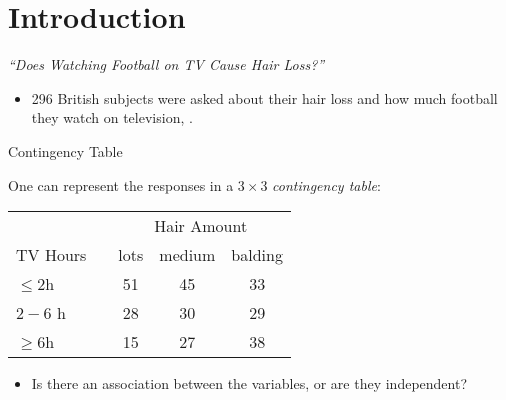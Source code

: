 \section{Introduction}

\begin{frame}{\emph{``Does Watching Football on TV Cause Hair Loss?''}}
    
    \begin{itemize}
        \item 296 British subjects were asked about their hair loss and how much football they watch on television, \cite{DMJSDS2003}.
    \end{itemize}

    \begin{block}{Contingency Table}

    One can represent the responses in a $3\times 3$ \emph{contingency table}:

    \begin{table}[h]
    \vspace{12pt}
        \begin{tabular}{@{}lcccc@{}} 
        & &  \multicolumn{3}{c}{Hair Amount}\\\cmidrule{3-5} 
        TV Hours & & lots & medium & balding\\ \midrule 
        $\leq 2$h & & 51 & 45 & 33 \\ 
        $2-6$ h & & 28 & 30 & 29 \\ 
        $\geq 6$h & & 15 & 27 & 38\\\bottomrule
        \end{tabular}
    \end{table} 
    \end{block}

    \begin{itemize}
        \item Is there an association between the variables, or are they independent?
    \end{itemize}

\end{frame}

